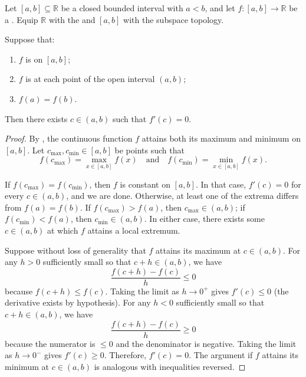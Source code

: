 \begin{theorem} \label{theorem:rolles_theorem_that_real_differentiable_functions_valued_in_the_reals_with_same_values_at_end_points_have_vanishing_derivative_at_some_point}
    Let $[a, b] \subseteq \mathbb{R}$ be a closed bounded interval with $a < b$, and let $f : [a, b] \to \mathbb{R}$ be a . Equip $\mathbb{R}$ with the  and $[a, b]$ with the subspace topology.

    Suppose that:
    \begin{enumerate}
        \item $f$ is  on $[a, b]$;
        \item $f$ is  at each point of the open interval $(a, b)$;
        \item $f(a) = f(b)$.
    \end{enumerate}
    Then there exists $c \in (a, b)$ such that $f'(c) = 0$.
\end{theorem}

\begin{proof}
    By , the continuous function $f$ attains both its maximum and minimum on $[a, b]$. Let $c_{\max}, c_{\min} \in [a, b]$ be points such that
    $$f(c_{\max}) = \max_{x \in [a,b]} f(x) \quad \text{and} \quad f(c_{\min}) = \min_{x \in [a,b]} f(x).$$

    If $f(c_{\max}) = f(c_{\min})$, then $f$ is constant on $[a, b]$. In that case, $f'(c) = 0$ for every $c \in (a, b)$, and we are done. Otherwise, at least one of the extrema differs from $f(a) = f(b)$. If $f(c_{\max}) > f(a)$, then $c_{\max} \in (a, b)$; if $f(c_{\min}) < f(a)$, then $c_{\min} \in (a, b)$. In either case, there exists some $c \in (a, b)$ at which $f$ attains a local extremum.

    Suppose without loss of generality that $f$ attains its maximum at $c \in (a, b)$. For any $h > 0$ sufficiently small so that $c + h \in (a, b)$, we have
    $$\frac{f(c+h) - f(c)}{h} \leq 0$$
    because $f(c+h) \leq f(c)$. Taking the limit as $h \to 0^+$ gives $f'(c) \leq 0$ (the derivative exists by hypothesis). For any $h < 0$ sufficiently small so that $c + h \in (a, b)$, we have
    $$\frac{f(c+h) - f(c)}{h} \geq 0$$
    because the numerator is $\leq 0$ and the denominator is negative. Taking the limit as $h \to 0^-$ gives $f'(c) \geq 0$. Therefore, $f'(c) = 0$. The argument if $f$ attains its minimum at $c \in (a, b)$ is analogous with inequalities reversed.
\end{proof}
